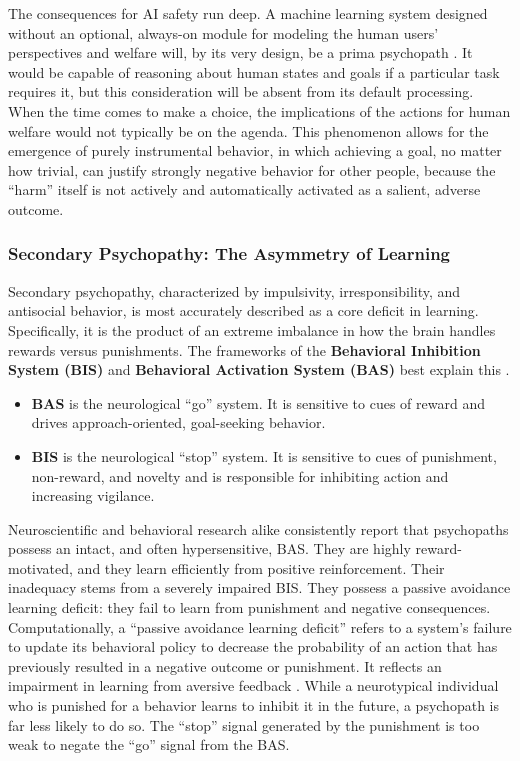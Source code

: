 \documentclass{article}
\begin{document}
The consequences for AI safety run deep. A machine learning system designed without an optional, always-on module for modeling the human users' perspectives and welfare will, by its very design, be a prima psychopath \citep{ref10, ref11}. It would be capable of reasoning about human states and goals if a particular task requires it, but this consideration will be absent from its default processing. When the time comes to make a choice, the implications of the actions for human welfare would not typically be on the agenda. This phenomenon allows for the emergence of purely instrumental behavior, in which achieving a goal, no matter how trivial, can justify strongly negative behavior for other people, because the “harm” itself is not actively and automatically activated as a salient, adverse outcome.
\subsubsection{Secondary Psychopathy: The Asymmetry of Learning}
Secondary psychopathy, characterized by impulsivity, irresponsibility, and antisocial behavior, is most accurately described as a core deficit in learning. Specifically, it is the product of an extreme imbalance in how the brain handles rewards versus punishments. The frameworks of the \textbf{Behavioral Inhibition System (BIS)} and \textbf{Behavioral Activation System (BAS)} best explain this \citep{ref24, ref36}.
\begin{itemize}
    \item \textbf{BAS} is the neurological “go” system. It is sensitive to cues of reward and drives approach-oriented, goal-seeking behavior.
    \item \textbf{BIS} is the neurological “stop” system. It is sensitive to cues of punishment, non-reward, and novelty and is responsible for inhibiting action and increasing vigilance.
\end{itemize}
Neuroscientific and behavioral research alike consistently report that psychopaths possess an intact, and often hypersensitive, BAS. They are highly reward-motivated, and they learn efficiently from positive reinforcement. Their inadequacy stems from a severely impaired BIS. They possess a passive avoidance learning deficit: they fail to learn from punishment and negative consequences. Computationally, a “passive avoidance learning deficit” refers to a system's failure to update its behavioral policy to decrease the probability of an action that has previously resulted in a negative outcome or punishment. It reflects an impairment in learning from aversive feedback \citep{ref4}. While a neurotypical individual who is punished for a behavior learns to inhibit it in the future, a psychopath is far less likely to do so. The “stop” signal generated by the punishment is too weak to negate the “go” signal from the BAS.
\end{document}
